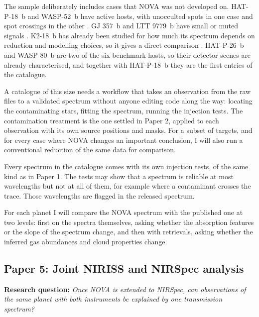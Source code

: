 The sample deliberately includes cases that NOVA was not developed on.
HAT-P-18~b and WASP-52~b have active hosts, with unocculted spots in one
case and spot crossings in the other
\citep{FournierTondreauEtAl2024,FournierTondreauEtAl2025}. GJ 357~b and
LTT 9779~b have small or muted signals
\citep{TaylorEtAl2025,RadicaEtAl2024}. K2-18~b has already been studied
for how much its spectrum depends on reduction and modelling choices, so
it gives a direct comparison \citep{SchmidtEtAl2025}. HAT-P-26~b and
WASP-80~b are two of the six benchmark hosts, so their detector scenes
are already characterised, and together with HAT-P-18~b they are the
first entries of the catalogue.

A catalogue of this size needs a workflow that takes an observation from
the raw files to a validated spectrum without anyone editing code along
the way: locating the contaminating stars, fitting the spectrum, running
the injection tests. The contamination treatment is the one settled in
Paper 2, applied to each observation with its own source positions and
masks. For a subset of targets, and for every case where NOVA changes an
important conclusion, I will also run a conventional reduction of the
same data for comparison.

Every spectrum in the catalogue comes with its own injection tests, of
the same kind as in Paper 1. The tests may show that a spectrum is
reliable at most wavelengths but not at all of them, for example where a
contaminant crosses the trace. Those wavelengths are flagged in the
released spectrum.

For each planet I will compare the NOVA spectrum with the published one
at two levels: first on the spectra themselves, asking whether the
absorption features or the slope of the spectrum change, and then with
retrievals, asking whether the inferred gas abundances and cloud
properties change.

\subsection{Paper 5: Joint NIRISS and NIRSpec analysis}
\label{subsec:fw_nirspec}

\noindent\textbf{Research question:} \textit{Once NOVA is extended to
NIRSpec, can observations of the same planet with both instruments be
explained by one transmission spectrum?}

